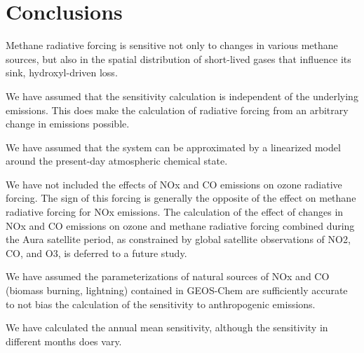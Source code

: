 \section{Conclusions}

Methane radiative forcing is sensitive not only to changes in various methane sources, but also in the spatial distribution of short-lived gases that influence its sink, hydroxyl-driven loss.

We have assumed that the sensitivity calculation is independent of the underlying emissions. This does make the calculation of radiative forcing from an arbitrary change in emissions possible.

We have assumed that the system can be approximated by a linearized model around the present-day atmospheric chemical state.

We have not included the effects of NOx and CO emissions on ozone radiative forcing. The sign of this forcing is generally the opposite of the effect on methane radiative forcing for NOx emissions. The calculation of the effect of changes in NOx and CO emissions on ozone and methane radiative forcing combined during the Aura satellite period, as constrained by global satellite observations of NO2, CO, and O3, is deferred to a future study.

We have assumed the parameterizations of natural sources of NOx and CO (biomass burning, lightning) contained in GEOS-Chem are sufficiently accurate to not bias the calculation of the sensitivity to anthropogenic emissions.

We have calculated the annual mean sensitivity, although the sensitivity in different months does vary.

